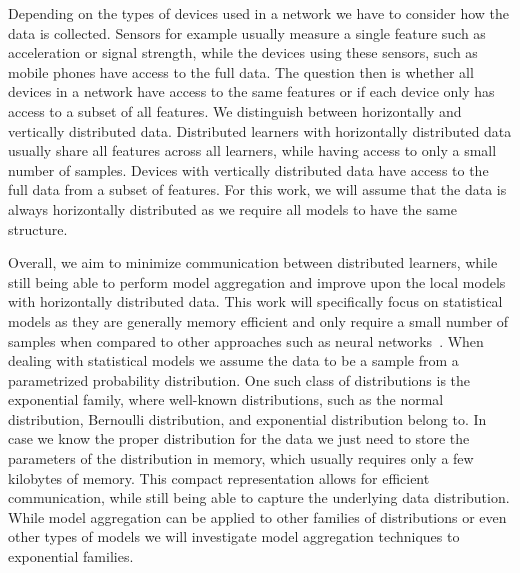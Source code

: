 Depending on the types of devices used in a network we have to consider how the data is collected.
Sensors for example usually measure a single feature such as acceleration or signal strength, while the devices using these sensors, such as mobile phones have access to the full data.
The question then is whether all devices in a network have access to the same features or if each device only has access to a subset of all features.
We distinguish between horizontally and vertically distributed data.
Distributed learners with horizontally distributed data usually share all features across all learners, while having access to only a small number of samples. 
Devices with vertically distributed data have access to the full data from a subset of features.
For this work, we will assume that the data is always horizontally distributed as we require all models to have the same structure.
%


Overall, we aim to minimize communication between distributed learners, while still being able to perform model aggregation and improve upon the local models with horizontally distributed data.
This work will specifically focus on statistical models as they are generally memory efficient and only require a small number of samples when compared to other approaches such as neural networks~\cite{bartlett1998sample}. 
When dealing with statistical models we assume the data to be a sample from a parametrized probability distribution.
One such class of distributions is the exponential family, where well-known distributions, such as the normal distribution, Bernoulli distribution, and exponential distribution belong to.
In case we know the proper distribution for the data we just need to store the parameters of the distribution in memory, which usually requires only a few kilobytes of memory.
This compact representation allows for efficient communication, while still being able to capture the underlying data distribution.
While model aggregation can be applied to other families of distributions or even other types of models we will investigate model aggregation techniques \wrt to exponential families.

